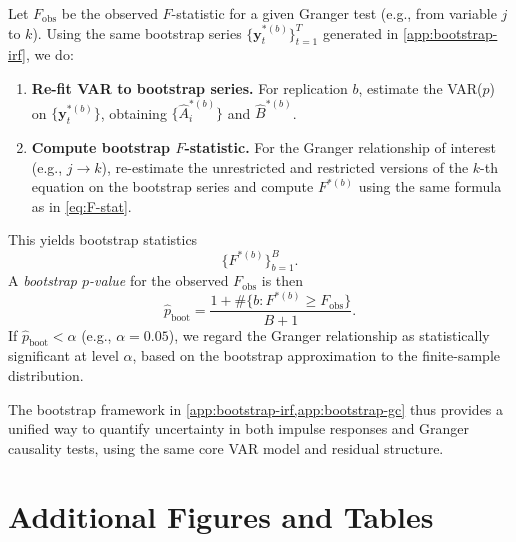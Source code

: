 \documentclass[11pt]{article}
\begin{document}
Let $F_{\text{obs}}$ be the observed $F$-statistic for a given
Granger test (e.g., from variable $j$ to $k$).
Using the same bootstrap series
$\{\mathbf{y}_t^{*(b)}\}_{t=1}^T$ generated in
\cref{app:bootstrap-irf}, we do:

\begin{enumerate}[leftmargin=1.5em,label=\textbf{(G\arabic*)}]
  \item \textbf{Re-fit VAR to bootstrap series.}
        For replication $b$, estimate the VAR($p$) on
        $\{\mathbf{y}_t^{*(b)}\}$, obtaining
        $\{\widehat{A}_i^{*(b)}\}$ and $\widehat{B}^{*(b)}$.

  \item \textbf{Compute bootstrap $F$-statistic.}
        For the Granger relationship of interest (e.g., $j \to k$),
        re-estimate the unrestricted and restricted versions of the
        $k$-th equation on the bootstrap series and compute
        $F^{*(b)}$ using the same formula as in \cref{eq:F-stat}.
\end{enumerate}

This yields bootstrap statistics
\begin{equation}
  \{ F^{*(b)} \}_{b=1}^B.
\end{equation}
A \emph{bootstrap $p$-value} for the observed $F_{\text{obs}}$ is then
\begin{equation}
  \widehat{p}_{\text{boot}}
  = \frac{
      1 + \#\{b : F^{*(b)} \ge F_{\text{obs}}\}
    }{
      B + 1
    }.
  \label{eq:bootstrap-pvalue}
\end{equation}
If $\widehat{p}_{\text{boot}} < \alpha$ (e.g., $\alpha = 0.05$), we regard
the Granger relationship as statistically significant at level $\alpha$,
based on the bootstrap approximation to the finite-sample distribution.

The bootstrap framework in \cref{app:bootstrap-irf,app:bootstrap-gc} thus
provides a unified way to quantify uncertainty in both impulse responses
and Granger causality tests, using the same core VAR model and residual
structure.

\section{Additional Figures and Tables}
\label{app:figs}

\end{document}
